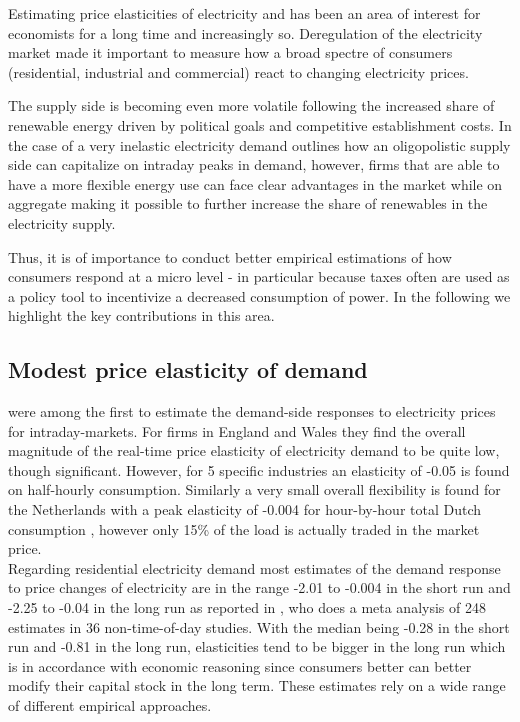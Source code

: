 \label{sec:background}
Estimating price elasticities of electricity and has been an area of interest for economists for a long time and increasingly so. Deregulation of the electricity market made it important to measure how a broad spectre of consumers (residential, industrial and commercial) react to changing electricity prices.
\par

The supply side is becoming even more volatile following the increased share of renewable energy driven by political goals and competitive establishment costs. In the case of a very inelastic electricity demand \citet{wolak2001impact} outlines how an oligopolistic supply side can capitalize on intraday peaks in demand, however, firms that are able to have a more flexible energy use can face clear advantages in the market while on aggregate making it possible to further increase the share of renewables in the electricity supply. \par
Thus, it is of importance to conduct better empirical estimations of how consumers respond at a micro level - in particular because taxes often are used as a policy tool to incentivize a decreased consumption of power. In the following we highlight the key contributions in this area.

\subsection{Modest price elasticity of demand}
\label{subsec:b_results}
\citet{patrick2001estimating} were among the first to estimate the demand-side responses to electricity prices for intraday-markets. For firms in England and Wales they find the overall magnitude of the real-time price elasticity of electricity demand to be quite low, though significant. However, for 5 specific industries an elasticity of -0.05 is found on half-hourly consumption. Similarly a very small overall flexibility is found for the Netherlands with a peak elasticity of -0.004 for hour-by-hour total Dutch consumption \citet{lijesen2007real}, however only 15\% of the load is actually traded in the market price.
\medskip\\
Regarding residential electricity demand most estimates of the demand response to price changes of electricity are in the range -2.01 to -0.004 in the short run and -2.25 to -0.04 in the long run as reported in \citet{espey2004turning}, who does a meta analysis of 248 estimates in 36 non-time-of-day studies. With the median being -0.28 in the short run and -0.81 in the long run, elasticities tend to be bigger in the long run which is in accordance with economic reasoning since consumers better can better modify their capital stock in the long term. These estimates rely on a wide range of different empirical approaches.

